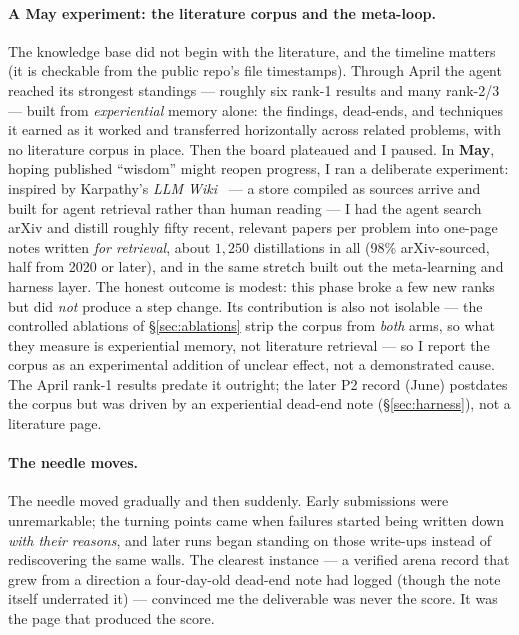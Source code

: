 \documentclass[11pt]{article}
\begin{document}
\paragraph{A May experiment: the literature corpus and the meta-loop.}
The knowledge base did not begin with the literature, and the timeline matters (it is checkable
from the public repo's file timestamps). Through April the agent reached its strongest standings
--- roughly six rank-1 results and many rank-2/3 --- built from \emph{experiential} memory alone:
the findings, dead-ends, and techniques it earned as it worked and transferred horizontally across
related problems, with no literature corpus in place. Then the board plateaued and I paused. In
\textbf{May}, hoping published ``wisdom'' might reopen progress, I ran a deliberate experiment:
inspired by Karpathy's \emph{LLM Wiki}~\cite{karpathy2026llmwiki} --- a store compiled as sources
arrive and built for agent retrieval rather than human reading --- I had the agent search arXiv
and distill roughly fifty recent, relevant papers per problem into one-page notes written
\emph{for retrieval}, about $1{,}250$ distillations in all (98\% arXiv-sourced, half from 2020 or
later), and in the same stretch built out the meta-learning and harness layer. The honest outcome
is modest: this phase broke a few new ranks but did \emph{not} produce a step change. Its
contribution is also not isolable --- the controlled ablations of \S\ref{sec:ablations} strip the
corpus from \emph{both} arms, so what they measure is experiential memory, not literature
retrieval --- so I report the corpus as an experimental addition of unclear effect, not a
demonstrated cause. The April rank-1 results predate it outright; the later P2 record (June)
postdates the corpus but was driven by an experiential dead-end note (\S\ref{sec:harness}), not a
literature page.

\paragraph{The needle moves.}
The needle moved gradually and then suddenly. Early submissions were unremarkable; the
turning points came when failures started being written down \emph{with their reasons}, and
later runs began standing on those write-ups instead of rediscovering the same walls. The
clearest instance --- a verified arena record that grew from a direction a four-day-old
dead-end note had logged (though the note itself underrated it) --- convinced me the deliverable was never the
score. It was the page that produced the score.
\end{document}
